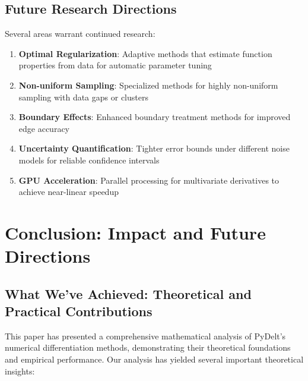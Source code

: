 \documentclass[10pt,journal,compsoc]{IEEEtran}
\begin{document}
\subsection{Future Research Directions}

Several areas warrant continued research:

\begin{enumerate}
    \item \textbf{Optimal Regularization}: Adaptive methods that estimate function properties from data for automatic parameter tuning
    
    \item \textbf{Non-uniform Sampling}: Specialized methods for highly non-uniform sampling with data gaps or clusters
    
    \item \textbf{Boundary Effects}: Enhanced boundary treatment methods for improved edge accuracy
    
    \item \textbf{Uncertainty Quantification}: Tighter error bounds under different noise models for reliable confidence intervals
    
    \item \textbf{GPU Acceleration}: Parallel processing for multivariate derivatives to achieve near-linear speedup
\end{enumerate}

\section{Conclusion: Impact and Future Directions}

\subsection{What We've Achieved: Theoretical and Practical Contributions}

This paper has presented a comprehensive mathematical analysis of PyDelt's numerical differentiation methods, demonstrating their theoretical foundations and empirical performance. Our analysis has yielded several important theoretical insights:
\end{document}
